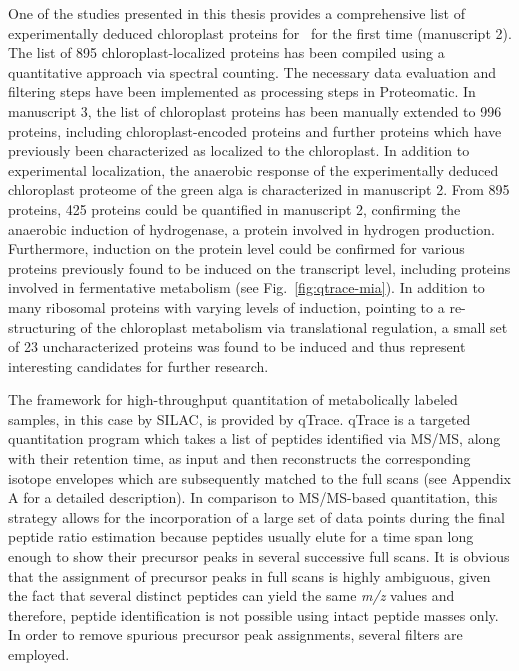 One of the studies presented in this thesis provides a comprehensive list of 
experimentally deduced chloroplast proteins for \cre~for the first time
(manuscript 2).
The list of 895 chloroplast-localized proteins has been compiled using
a quantitative approach via spectral counting.
The necessary data evaluation and filtering steps have been implemented
as processing steps in Proteomatic.
In manuscript 3, the list of chloroplast proteins has been manually extended 
to 996 proteins, including chloroplast-encoded proteins and further proteins
which have previously been characterized as localized to the chloroplast.
In addition to experimental localization, the anaerobic response of the 
experimentally deduced chloroplast proteome of the green alga is characterized 
in manuscript 2. 
From 895 proteins, 425 proteins could be quantified in manuscript 2, 
confirming the anaerobic induction of hydrogenase, a protein involved in 
hydrogen production.
Furthermore, induction on the protein level could be confirmed for various 
proteins previously found to be induced on the transcript level,
including proteins involved in fermentative metabolism (see Fig.~\ref{fig:qtrace-mia}).
In addition to many ribosomal proteins with varying levels of induction,
pointing to a re-structuring of the chloroplast metabolism via translational 
regulation, a small set of 23 uncharacterized proteins was found to be induced
and thus represent interesting candidates for further research.

The framework for high-throughput quantitation of metabolically labeled 
samples, in this case by SILAC, is provided by qTrace.
qTrace is a targeted quantitation program which takes a list of peptides
identified via MS/MS, along with their retention time, as input and then 
reconstructs the corresponding isotope envelopes which are subsequently 
matched to the full scans (see Appendix A for a detailed description).
In comparison to MS/MS-based quantitation, this strategy allows for the
incorporation of a large set of data points during the final peptide ratio
estimation because peptides usually elute for a time span long enough to
show their precursor peaks in several successive full scans.
It is obvious that the assignment of precursor peaks in full scans is highly
ambiguous, given the fact that several distinct peptides can yield the
same {\em m/z} values and therefore, peptide identification is not possible
using intact peptide masses only.
In order to remove spurious precursor peak assignments, several filters are 
employed.

